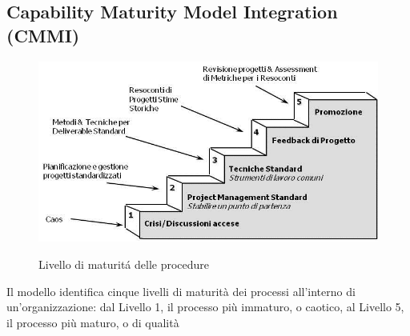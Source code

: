 \subsection{Capability Maturity Model Integration (CMMI)}
\begin{figure} [H]
\centering
     \includegraphics[scale=0.8]{../modello/img/CMMI}\\
     \caption{Livello di maturit\'a delle procedure}\label{fig:2}
\end{figure}
Il modello identifica cinque livelli di maturità dei processi all'interno di un'organizzazione: dal Livello 1, il processo più immaturo, o caotico, al Livello 5, il processo più maturo, o di qualità
